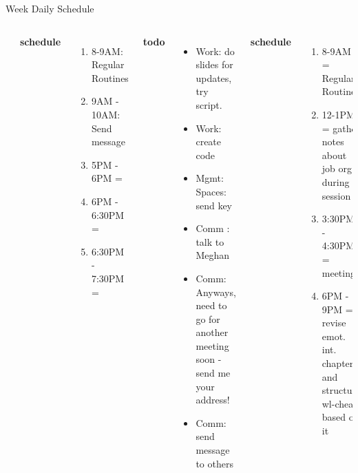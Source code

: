\documentclass[serif, mathserif, final]{beamer}
\newcommand{\te}[1]{\textit{TimeEst:} \textit{#1}}
\newcommand{\prio}[1]{\textit{Priority:} \textit{#1}}
\newcommand{\dl}[1]{#1}
\begin{document}
\begin{frame}
\begin{columns}
\begin{column}{0.50\linewidth}
\begin{block}{Week Daily Schedule}
\begin{columns}
\begin{itemize}
          \end{itemize}
          \textbf{\small schedule} \\
          \begin{enumerate}
            \tiny \item \tiny 8-9AM: Regular Routines 
          \item \tiny 9AM - 10AM: Send message 
          \item \tiny 5PM - 6PM = 
          \item \tiny 6PM - 6:30PM = 
            \item \tiny 6:30PM - 7:30PM = 
          \end{enumerate} 
          \textbf{\small todo}\\
          \begin{itemize}  
          \item \tiny Work: do slides for updates, try script. 
          \item \tiny Work: create code 
          \item \tiny Mgmt: Spaces: send key 
          \item \tiny Comm : talk to Meghan 
            \item \tiny Comm: Anyways, need to go for another meeting
              soon - send me your address! 
          \item \tiny Comm: send message to others  
          \end{itemize}
          
          \textbf{\small schedule}\\
          \begin{enumerate} 
            \tiny \item \tiny 8-9AM = Regular Routines 
            \item \tiny 12-1PM = gather notes about job org. during
              session 
            \item \tiny 3:30PM - 4:30PM = meeting 
            \item \tiny 6PM - 9PM = revise emot. int. chapter and
              structure wl-cheat based on it 
          \end{enumerate} 
          
          \textbf{\small todo}\\ 
          \begin{itemize}
            \tiny \item \tiny Work: updates on GPU \dl{}
            \tiny \item \tiny Work: 
            \te{} \prio{}
            \tiny \item \tiny Mgmt:Spaces: clean up the ViveksLaptop
            directory Work to have the work stuff integrated. 
            \tiny \item \tiny Comm: gather people from matrimony site
            \te{1 hour}. 


\end{itemize}
\end{columns}
\end{block}
\end{column}
\end{columns}
\end{frame}
\end{document}
